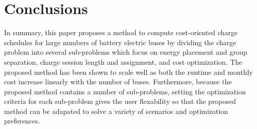 \section{Conclusions}
In summary, this paper proposes a method to compute cost-oriented charge schedules for large numbers of battery electric buses by dividing the charge problem into several sub-problems which focus on energy placement and group separation, charge session length and assignment, and cost optimization. The proposed method has been shown to scale well as both the runtime and monthly cost increase linearly with the number of buses. 
Furthermore, because the proposed method contains a number of sub-problems, setting the optimization criteria for each sub-problem gives the user flexability so that the proposed method can be adapated to solve a variety of scenarios and optimization preferences.
